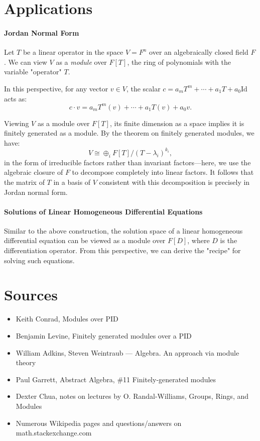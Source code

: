 \documentclass{article}
\newif\ifusemulticols
\theoremstyle{definition}
\theoremstyle{remark}
\theoremstyle{plain}
\theoremstyle{plain}
\newenvironment{mymulticols}
    { \ifusemulticols \begin{multicols}{2} \fi }
    { \ifusemulticols \end{multicols} \fi }
\begin{document}
\begin{mymulticols}
\section{Applications}%
\paragraph{Jordan Normal Form}
Let $T$ be a linear operator in the space $V = F^n$ over an algebraically closed field $F$. We can
view $V$ as a \emph{module} over $F[T]$, the ring of polynomials with the variable "operator" $T$.

In this perspective, for any vector $v \in V$, the scalar $c = a_m T^m + \cdots + a_1 T + a_0
\text{Id}$ acts as:
$$c \cdot v = a_m T^m(v) + \cdots + a_1 T(v) + a_0 v.$$

Viewing $V$ as a module over $F[T]$, its finite dimension as a space implies it is finitely
generated as a module. By the theorem on finitely generated modules, we have:
$$V \cong \oplus_i F[T] / (T - \lambda_i)^{k_i},$$
in the form of irreducible factors rather than invariant factors—here, we use the algebraic closure
of $F$ to decompose completely into linear factors. It follows that the matrix of $T$ in a basis of
$V$ consistent with this decomposition is precisely in Jordan normal form.

\paragraph{Solutions of Linear Homogeneous Differential Equations}
Similar to the above construction, the solution space of a linear homogeneous differential equation
can be viewed as a module over $F[D]$, where $D$ is the differentiation operator. From this
perspective, we can derive the "recipe" for solving such equations.

\section{Sources}%

\begin{itemize}
    \item Keith Conrad, Modules over PID
    \item Benjamin Levine, Finitely generated modules over a PID
    \item William Adkins, Steven Weintraub — Algebra. An approach via module theory
    \item Paul Garrett, Abstract Algebra, \#11 Finitely-generated modules
    \item Dexter Chua, notes on lectures by O. Randal-Williams, Groups, Rings, and Modules
    \item Numerous Wikipedia pages and questions/answers on math.stackexchange.com
\end{itemize}

\end{mymulticols}
\end{document}
